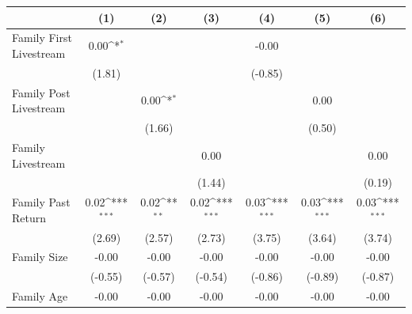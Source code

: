 {
\def\sym#1{\ifmmode^{#1}\else\(^{#1}\)\fi}
\begin{tabular}{l*{6}{c}}
\toprule
                    &\multicolumn{1}{c}{(1)}         &\multicolumn{1}{c}{(2)}         &\multicolumn{1}{c}{(3)}         &\multicolumn{1}{c}{(4)}         &\multicolumn{1}{c}{(5)}         &\multicolumn{1}{c}{(6)}         \\
\midrule
Family First Livestream&        0.00\sym{*}  &                     &                     &       -0.00         &                     &                     \\
                    &      (1.81)         &                     &                     &     (-0.85)         &                     &                     \\
\addlinespace
Family Post Livestream&                     &        0.00\sym{*}  &                     &                     &        0.00         &                     \\
                    &                     &      (1.66)         &                     &                     &      (0.50)         &                     \\
\addlinespace
Family Livestream   &                     &                     &        0.00         &                     &                     &        0.00         \\
                    &                     &                     &      (1.44)         &                     &                     &      (0.19)         \\
\addlinespace
Family Past Return  &        0.02\sym{***}&        0.02\sym{**} &        0.02\sym{***}&        0.03\sym{***}&        0.03\sym{***}&        0.03\sym{***}\\
                    &      (2.69)         &      (2.57)         &      (2.73)         &      (3.75)         &      (3.64)         &      (3.74)         \\
\addlinespace
Family Size         &       -0.00         &       -0.00         &       -0.00         &       -0.00         &       -0.00         &       -0.00         \\
                    &     (-0.55)         &     (-0.57)         &     (-0.54)         &     (-0.86)         &     (-0.89)         &     (-0.87)         \\
\addlinespace
Family Age          &       -0.00         &       -0.00         &       -0.00         &       -0.00         &       -0.00         &       -0.00         \\

\end{tabular}}
